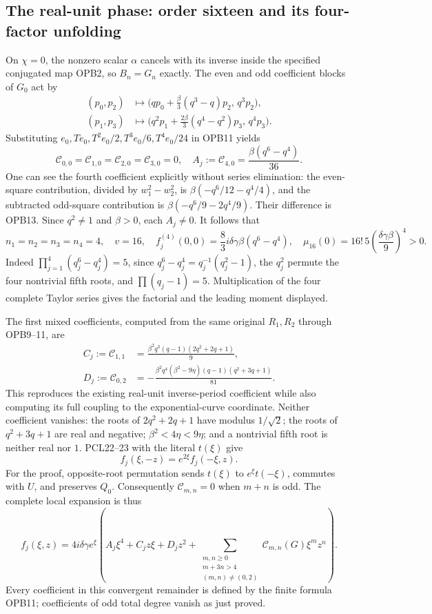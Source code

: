 \subsection{The real-unit phase: order sixteen and its four-factor unfolding}
On $\chi=0$, the nonzero scalar $\alpha$ cancels with its inverse
inside the specified conjugated map OPB2, so $B_n=G_n$ exactly.
The even and odd coefficient blocks of $G_0$ act by
\[
 \begin{split}
 (p_0,p_2)&\longmapsto
 \bigl(qp_0+\tfrac\beta3(q^3-q)p_2,\,q^3p_2\bigr),\\
 (p_1,p_3)&\longmapsto
 \bigl(q^2p_1+\tfrac{2\beta}3(q^4-q^2)p_3,\,q^4p_3\bigr).
 \end{split}\tag{OPB12}
\]
Substituting $e_0,T e_0,T^2e_0/2,T^3e_0/6,T^4e_0/24$
in OPB11 yields
\[
 \mathcal C_{0,0}=\mathcal C_{1,0}=\mathcal C_{2,0}
 =\mathcal C_{3,0}=0,\quad
 A_j:=\mathcal C_{4,0}=\frac{\beta(q^6-q^4)}{36}.
 \tag{OPB13}
\]
One can see the fourth coefficient explicitly without series elimination:
the even-square contribution, divided by $w_1^2-w_2^2$, is
$\beta(-q^6/12-q^4/4)$, and the subtracted odd-square contribution
is $\beta(-q^6/9-2q^4/9)$. Their difference is OPB13.
Since $q^2\ne1$ and $\beta>0$, each $A_j\ne0$. It follows that
\[
 n_1=n_2=n_3=n_4=4,\quad v=16,\quad
 f_j^{(4)}(0,0)=\frac83i\delta\gamma\beta(q^6-q^4),\quad
 \boxed{\mu_{16}(0)=16!\,5\left(\frac{\delta\gamma\beta}{9}\right)^4>0.}
 \tag{OPB14}
\]
Indeed $\prod_{j=1}^4(q_j^6-q_j^4)=5$, since $q_j^6-q_j^4
=q_j^{-1}(q_j^2-1)$, the $q_j^2$ permute the four nontrivial fifth
roots, and $\prod(q_j-1)=5$. Multiplication of the four complete
Taylor series gives the factorial and the leading moment displayed.

The first mixed coefficients, computed from the same original $R_1,R_2$
through OPB9--11, are
\[
 \begin{split}
 C_j:=\mathcal C_{1,1}
 &=\frac{\beta^2q^3(q-1)(2q^2+2q+1)}9,\\
 D_j:=\mathcal C_{0,2}
 &=-\frac{\beta^2q^4(\beta^2-9\eta)(q-1)(q^2+3q+1)}{81}.
 \end{split}\tag{OPB15}
\]
This reproduces the existing real-unit inverse-period coefficient while
also computing its full coupling to the exponential-curve coordinate.
Neither coefficient vanishes: the roots of $2q^2+2q+1$ have modulus
$1/\sqrt2$; the roots of $q^2+3q+1$ are real and negative;
$\beta^2<4\eta<9\eta$; and a nontrivial fifth root is neither real
nor $1$. PCL22--23 with the literal $t(\xi)$ give
\[
 f_j(\xi,-z)=e^{2\xi}f_j(-\xi,z).
 \tag{OPB16}
\]
For the proof, opposite-root permutation sends $t(\xi)$ to
$e^\xi t(-\xi)$, commutes with $U$, and preserves $Q_0$.
Consequently $\mathcal C_{m,n}=0$ when $m+n$ is odd. The complete
local expansion is thus
\[
 f_j(\xi,z)=4i\delta\gamma e^\xi
 \left(A_j\xi^4+C_jz\xi+D_jz^2+
       \sum_{\substack{m,n\ge0\\m+3n>4\\(m,n)\ne(0,2)}}
           \mathcal C_{m,n}(G)\xi^mz^n\right).
 \tag{OPB17}
\]
Every coefficient in this convergent remainder is defined by the finite
formula OPB11; coefficients of odd total degree vanish as just proved.

